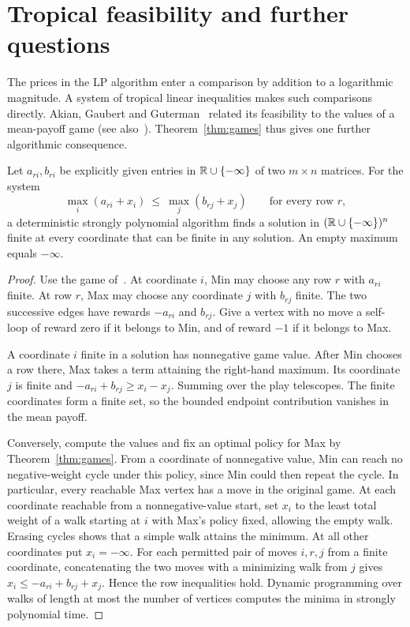 \section{Tropical feasibility and further questions}\label{sec:closing}

The prices in the LP algorithm enter a comparison by addition to a logarithmic
magnitude. A system of tropical linear inequalities makes such comparisons
directly. Akian, Gaubert and Guterman~\cite{AGG} related its feasibility
to the values of a mean-payoff game (see also~\cite{MSS,DG}).
Theorem~\ref{thm:games} thus gives one further algorithmic consequence.

\begin{corollary}\label{cor:tropical}
Let \(a_{ri},b_{ri}\) be explicitly given entries in
\(\mathbb R\cup\{-\infty\}\) of two \(m\times n\) matrices.
For the system
\[
                \max_i(a_{ri}+x_i)\ \le\ \max_j(b_{rj}+x_j)
                  \qquad\text{for every row \(r\)},
\]
a deterministic strongly polynomial algorithm finds a solution in
\((\mathbb R\cup\{-\infty\})^n\) finite at every coordinate that can be
finite in any solution. An empty maximum equals \(-\infty\).
\end{corollary}

\begin{proof}
Use the game of~\cite{AGG}. At coordinate \(i\), Min may choose any row
\(r\) with \(a_{ri}\) finite. At row \(r\), Max may choose any coordinate
\(j\) with \(b_{rj}\) finite. The two successive edges have rewards
\(-a_{ri}\) and \(b_{rj}\). Give a vertex with no move a self-loop of
reward zero if it belongs to Min, and of reward \(-1\) if it belongs to Max.

A coordinate \(i\) finite in a solution has nonnegative game value.
After Min chooses a row there, Max takes a term attaining the right-hand
maximum. Its coordinate \(j\) is finite and
\(-a_{ri}+b_{rj}\ge x_i-x_j\). Summing over the play telescopes.
The finite coordinates form a finite set, so the bounded endpoint
contribution vanishes in the mean payoff.

Conversely, compute the values and fix an optimal policy for Max by
Theorem~\ref{thm:games}. From a coordinate of nonnegative value, Min can
reach no negative-weight cycle under this policy, since Min could then
repeat the cycle. In particular, every reachable Max vertex has a move
in the original game. At each coordinate reachable from a nonnegative-value
start, set \(x_i\) to the least total weight of a walk starting at \(i\)
with Max's policy fixed, allowing the empty walk. Erasing cycles shows
that a simple walk attains the minimum. At all other coordinates put
\(x_i=-\infty\). For each permitted pair of moves \(i,r,j\) from a
finite coordinate, concatenating the two moves with a minimizing walk
from \(j\) gives \(x_i\le -a_{ri}+b_{rj}+x_j\). Hence the row
inequalities hold. Dynamic programming over walks of length at most
the number of vertices computes the minima in strongly polynomial time.
\end{proof}

